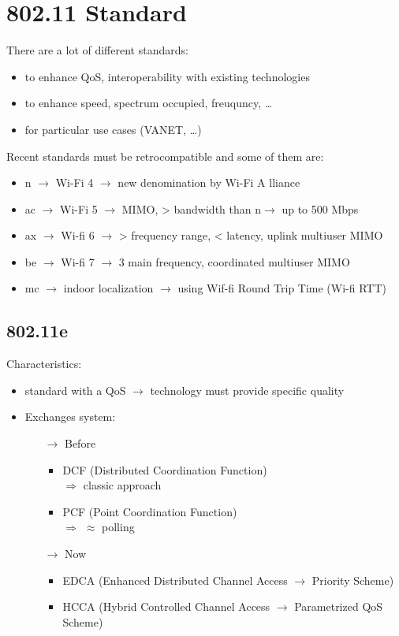 \section{802.11 Standard}
There are a lot of different standards:
\begin{itemize}
    \item to enhance QoS, interoperability with existing technologies
    \item to enhance speed, spectrum occupied, freuquncy, \dots
    \item for particular use cases (VANET, \dots)
\end{itemize}
Recent standards must be retrocompatible and some of them are:
\begin{itemize}
    \item n $\rightarrow$ Wi-Fi 4 $\rightarrow$ new denomination by Wi-Fi A lliance
    \item ac $\rightarrow$ Wi-Fi 5 $\rightarrow$ MIMO, > bandwidth than n$\rightarrow$
    up to 500 Mbps
    \item ax $\rightarrow$ Wi-fi 6 $\rightarrow$ > frequency range, < latency, uplink multiuser MIMO
    \item be $\rightarrow$ Wi-fi 7 $\rightarrow$ 3 main frequency, coordinated multiuser MIMO
    \item mc $\rightarrow$ indoor localization $\rightarrow$ using Wif-fi Round Trip Time (Wi-fi RTT) 
\end{itemize}
\subsection{802.11e}
Characteristics:
\begin{itemize}
    \item standard with a QoS $\rightarrow$ technology must provide specific quality
    \item Exchanges system:
    \begin{itemize}
        \item[$\rightarrow$] Before
        \begin{itemize}
            \item DCF (Distributed Coordination Function)\\
            $\Rightarrow$ classic approach
            \item PCF (Point Coordination Function)\\
            $\Rightarrow$ $\approx$ polling 
        \end{itemize}
        \item[$\rightarrow$] Now
        \begin{itemize}
            \item EDCA (Enhanced Distributed Channel Access $\rightarrow$ Priority Scheme)
            \item HCCA (Hybrid Controlled Channel Access $\rightarrow$ Parametrized QoS Scheme)
        \end{itemize}
    \end{itemize}
\end{itemize}

